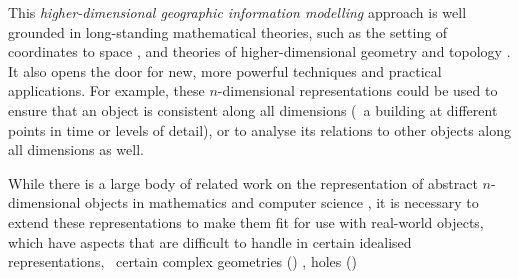 
This \emph{higher-dimensional geographic information modelling} approach is well grounded in long-standing mathematical theories, such as the setting of coordinates to space \citep{Descartes37}, and theories of higher-dimensional geometry \citep{Riemann68} and topology \citep{Poincare95}.
It also opens the door for new, more powerful techniques and practical applications.
For example, these $n$-dimensional representations could be used to ensure that an object is consistent along all dimensions (\eg\ a building at different points in time or levels of detail), or to analyse its relations to other objects along all dimensions as well.


While there is a large body of related work on the representation of abstract $n$-dimensional objects in mathematics and computer science \citep{Brisson93,Lienhardt94}, it is necessary to extend these representations to make them fit for use with real-world objects, which have aspects that are difficult to handle in certain idealised representations, \eg\ certain complex geometries ()
, holes ()
